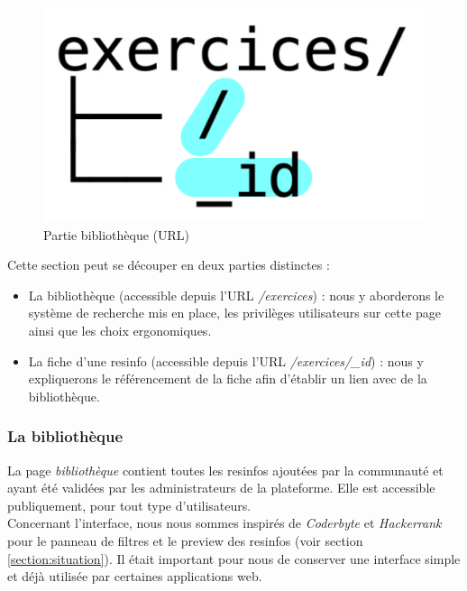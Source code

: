 \begin{figure}[H]
    \includegraphics[width=\textwidth,height=0.08\textheight,keepaspectratio]{images/client/exercices.jpeg}
    \centering
    \caption[SourceCode : partie bibliothèque]{Partie bibliothèque (URL)}
\end{figure}

Cette section peut se découper en deux parties distinctes :

\begin{itemize}
    \item La bibliothèque (accessible depuis l'URL \textit{/exercices}) : nous y aborderons le système de recherche mis en place, les privilèges utilisateurs sur cette page ainsi que les choix ergonomiques.\\
    \item La \gls{fiche} d'une \gls{resinfo} (accessible depuis l'URL \textit{/exercices/\_id}) : nous y expliquerons le référencement de la \gls{fiche} afin d'établir un lien avec de la bibliothèque.
\end{itemize}

\subsubsection{La bibliothèque}

La page \textit{bibliothèque} contient toutes les \glspl{resinfo} ajoutées par la communauté et ayant été validées par les administrateurs de la plateforme. Elle est accessible publiquement, pour tout type d'utilisateurs.\\

Concernant l'interface, nous nous sommes inspirés de \textit{Coderbyte} et \textit{Hackerrank} pour le panneau de filtres et le preview des \glspl{resinfo} (voir section \ref{section:situation}). Il était important pour nous de conserver une interface simple et déjà utilisée par certaines applications web.

